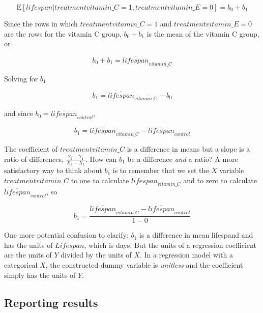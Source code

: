 \documentclass[]{book}
\begin{document}
\begin{equation}
\mathrm{E}[lifespan|treatmentvitamin\_C=1, treatmentvitamin\_E=0] = b_0 + b_1
\end{equation}

Since the rows in which \(treatmentvitamin\_C = 1\) and \(treatmentvitamin\_E = 0\) are the rows for the vitamin C group, \(b_0 + b_1\) is the mean of the vitamin C group, or

\begin{equation}
b_0 + b_1 = \overline{lifespan}_{vitamin\_C}
\end{equation}

Solving for \(b_1\)

\begin{equation}
b_1 = \overline{lifespan}_{vitamin\_C} - b_0
\end{equation}

and since \(b_0 = \overline{lifespan}_{control}\),

\begin{equation}
b_1 = \overline{lifespan}_{vitamin\_C} - \overline{lifespan}_{control}
\end{equation}

The coefficient of \(treatmentvitamin\_C\) is a difference in means but a slope is a ratio of differences, \(\frac{Y_2 - Y_1}{X_2 - X_1}\). How can \(b_1\) be a difference \emph{and} a ratio? A more satisfactory way to think about \(b_1\) is to remember that we set the \(X\) variable \(treatmentvitamin\_C\) to one to calculate \(\overline{lifespan}_{vitamin\_C}\) and to zero to calculate \(\overline{lifespan}_{control}\), so

\begin{equation}
b_1 = \frac{\overline{lifespan}_{vitamin\_C} - \overline{lifespan}_{control}}{1-0}
\end{equation}

One more potential confusion to clarify: \(b_1\) is a difference in mean lifespand and has the units of \(Lifespan\), which is days. But the units of a regression coefficient are the units of \(Y\) divided by the units of \(X\). In a regression model with a categorical \(X\), the constructed dummy variable is \emph{unitless} and the coefficient simply has the units of \(Y\).

\hypertarget{reporting-results}{%
\subsection{Reporting results}\label{reporting-results}}
\end{document}
